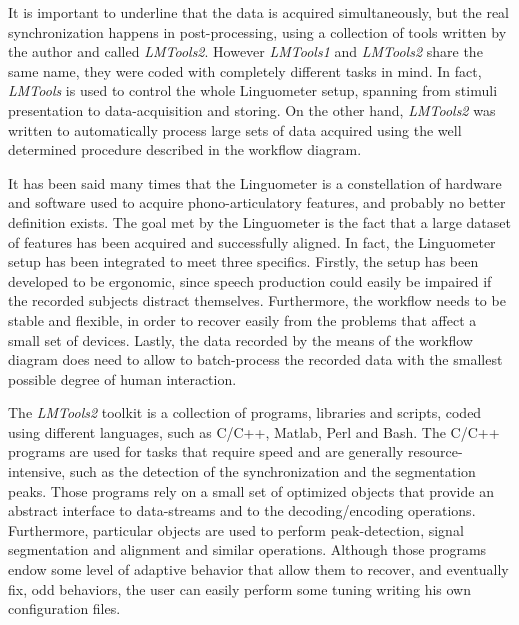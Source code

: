 It is important to underline that the data is acquired simultaneously, but the
real synchronization happens in post-processing, using a collection of tools
written by the author and called \emph{LMTools2}.
However \emph{LMTools1} and \emph{LMTools2} share the same name, they were coded
with completely different tasks in mind.
In fact, \emph{LMTools} is used to control the whole Linguometer setup, spanning
from stimuli presentation to data-acquisition and storing.
On the other hand, \emph{LMTools2} was written to automatically process large
sets of data acquired using the well determined procedure described in the
workflow diagram.

It has been said many times that the Linguometer is a constellation of hardware
and software used to acquire phono-articulatory features, and probably no better
definition exists.
The goal met by the Linguometer is the fact that a large dataset of features has
been acquired and successfully aligned.
In fact, the Linguometer setup has been integrated to meet three specifics.
Firstly, the setup has been developed to be ergonomic, since speech production
could easily be impaired if the recorded subjects distract themselves.
Furthermore, the workflow needs to be stable and flexible, in order to recover
easily from the problems that affect a small set of devices.
Lastly, the data recorded by the means of the workflow diagram does need to 
allow to batch-process the recorded data with the smallest possible degree of
human interaction.

The \emph{LMTools2} toolkit is a collection of programs, libraries and
scripts, coded using different languages, such as C/C++, Matlab, Perl and Bash.
The C/C++ programs are used for tasks that require speed and are generally
resource-intensive, such as the detection of the synchronization and the
segmentation peaks. 
Those programs rely on a small set of optimized objects that provide an
abstract interface to data-streams and to the decoding/encoding operations.
Furthermore, particular objects are used to perform peak-detection, signal
segmentation and alignment and similar operations.
Although those programs endow some level of adaptive behavior that allow them
to recover, and eventually fix, odd behaviors, the user can easily perform
some tuning writing his own configuration files.


